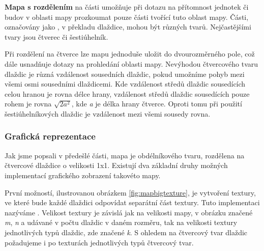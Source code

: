 \textbf{Mapa s rozdělením} na části umožňuje při dotazu na přítomnost jednotek či budov v oblasti mapy prozkoumat pouze části tvořící tuto oblast mapy. Části, označovány jako \textit{ }, v překladu dlaždice, mohou být různých tvarů. Nejčastějšími tvary jsou čtverec či šestiúhelník. 

Při rozdělení na čtverce lze mapu jednoduše uložit do dvourozměrného pole, což dále usnadňuje dotazy na prohledání oblasti mapy. Nevýhodou čtvercového tvaru dlaždic je různá vzdálenost sousedních dlaždic, pokud umožníme pohyb mezi všemi osmi sousedními dlaždicemi. Kde vzdálenost středů dlaždic sousedících celou hranou je rovna délce hrany, vzdálenost středů dlaždic sousedících pouze rohem je rovna \(\sqrt{2a^2}\), kde \textit{a} je délka hrany čtverce. Oproti tomu při použití šestiúhelníkových dlaždic je vzdálenost mezi všemi sousedy rovna. 

\subsubsection{Grafická reprezentace} 
Jak jsme popsali v předešlé části, mapa je obdélníkového tvaru, rozdělena na čtvercové dlaždice o velikosti 1x1. Existují dva základní druhy možných implementací grafického zobrazení takovéto mapy.

První možností, ilustrovanou obrázkem \ref{fig:mapbigtexture}, je vytvoření textury, ve které bude každé dlaždici odpovídat separátní část textury. Tuto implementaci nazýváme . Velikost textury je závislá jak na velikosti mapy, v obrázku značené \textit{m}, \textit{n} a udávané v počtu dlaždic v daném rozměru, tak na velikosti textury jednotlivých typů dlaždic, zde značené \textit{k}. S ohledem na čtvercový tvar dlaždic požadujeme i po texturách jednotlivých typů čtvercový tvar. 


